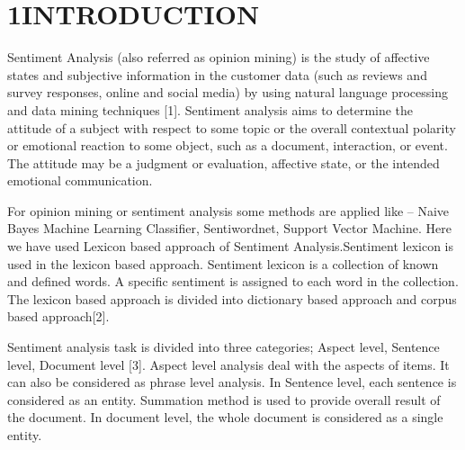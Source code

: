 \documentclass[12pt]{article}
\begin{document}
\vspace{\baselineskip}\section*{ 1\hspace*{10pt}INTRODUCTION}
\begin{justify}
Sentiment Analysis (also referred as opinion mining) is the study of affective states and subjective information in the customer data (such as reviews and survey responses, online and social media) by using natural language processing and data mining techniques [1]. Sentiment analysis aims to determine the attitude of a subject with respect to some topic or the overall contextual polarity or emotional reaction to some object, such as a document, interaction, or event. The attitude may be a judgment or evaluation, affective state, or the intended emotional communication.
\end{justify}\par

\begin{justify}
For opinion mining or sentiment analysis some methods are applied like – Naive Bayes Machine Learning Classifier, Sentiwordnet, Support Vector Machine. Here we have used Lexicon based approach of Sentiment Analysis.Sentiment lexicon is used in the lexicon based approach. Sentiment lexicon is a collection of known and defined words. A specific sentiment is assigned to each word in the collection. The lexicon based approach is divided into dictionary based approach and corpus based approach[2].
\end{justify}\par

\begin{justify}
Sentiment analysis task is divided into three categories; Aspect level, Sentence level, Document level [3]. Aspect level analysis deal with the aspects of items. It can also be considered as phrase level analysis. In Sentence level, each sentence is considered as an entity. Summation method is used to provide overall result of the document. In document level, the whole document is considered as a single entity.
\end{justify}\par


\vspace{\baselineskip}

\newpage
\end{document}
